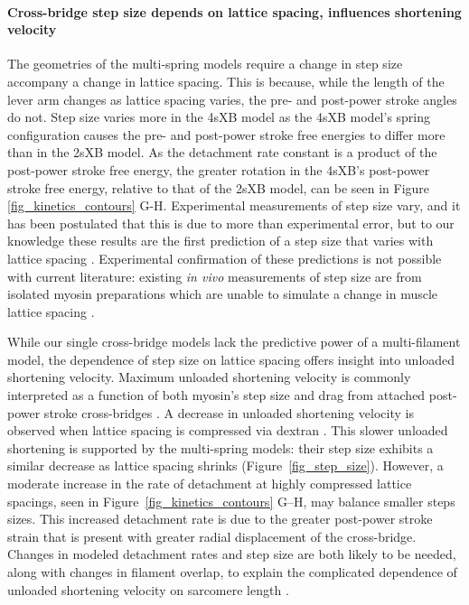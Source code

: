 \documentclass[10pt]{article}
\newcommand{\citep}[1]{\cite{#1}} %
\begin{document}
\paragraph{Cross-bridge step size depends on lattice spacing, influences shortening velocity} %
The geometries of the multi-spring models require a change in step size accompany a change in lattice spacing. 
This is because, while the length of the lever arm changes as lattice spacing varies, the pre- and post-power stroke angles do not. 
Step size varies more in the 4sXB model as the 4sXB model's spring configuration causes the pre- and post-power stroke free energies to differ more than in the 2sXB model. 
As the detachment rate constant is a product of the post-power stroke free energy, the greater rotation in the 4sXB's post-power stroke free energy, relative to that of the 2sXB model, can be seen in Figure \ref{fig_kinetics_contours} G-H. 
Experimental measurements of step size vary, and it has been postulated that this is due to more than experimental error, but to our knowledge these results are the first prediction of a step size that varies with lattice spacing \citep{Brenner2006}.
Experimental confirmation of these predictions is not possible with current literature: existing \textit{in vivo} measurements of step size are from isolated myosin preparations which are unable to simulate a change in muscle lattice spacing \citep{HowardBook, Peterman2004}. 

While our single cross-bridge models lack the predictive power of a multi-filament model, the dependence of step size on lattice spacing offers insight into unloaded shortening velocity. 
Maximum unloaded shortening velocity is commonly interpreted as a function of both myosin's step size and drag from attached post-power stroke cross-bridges \citep{Gordon2000}. 
A decrease in unloaded shortening velocity is observed when lattice spacing is compressed via dextran \citep{Goldman1987, Metzger1987}. 
This slower unloaded shortening is supported by the multi-spring models: their step size exhibits a similar decrease as lattice spacing shrinks (Figure~\ref{fig_step_size}). 
However, a moderate increase in the rate of detachment at highly compressed lattice spacings, seen in Figure~\ref{fig_kinetics_contours} G--H, may balance smaller steps sizes. 
This increased detachment rate is due to the greater post-power stroke strain that is present with greater radial displacement of the cross-bridge. 
Changes in modeled detachment rates and step size are both likely to be needed, along with changes in filament overlap, to explain the complicated dependence of unloaded shortening velocity on sarcomere length \citep{Edman1979}. 
\end{document}
